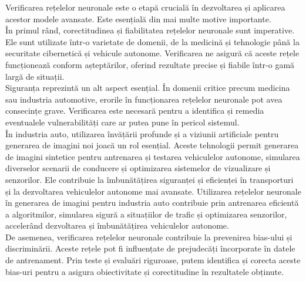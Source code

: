 \hspace{0.5 cm}
Verificarea rețelelor neuronale este o etapă crucială în dezvoltarea și aplicarea acestor modele avansate. Este esențială din mai multe motive importante. \\

În primul rând, corectitudinea și fiabilitatea rețelelor neuronale sunt imperative. Ele sunt utilizate într-o varietate de domenii, de la medicină și tehnologie până la securitate cibernetică și vehicule autonome. Verificarea ne asigură că aceste rețele funcționează conform așteptărilor, oferind rezultate precise și fiabile într-o gamă largă de situații. \\

Siguranța reprezintă un alt aspect esențial. În domenii critice precum medicina sau industria automotive, erorile în funcționarea rețelelor neuronale pot avea consecințe grave. Verificarea este necesară pentru a identifica și remedia eventualele vulnerabilități care ar putea pune în pericol sistemul. \\

În industria auto, utilizarea învățării profunde și a viziunii artificiale pentru generarea de imagini noi joacă un rol esențial. Aceste tehnologii permit generarea de imagini sintetice pentru antrenarea și testarea vehiculelor autonome, simularea diverselor scenarii de conducere și optimizarea sistemelor de vizualizare și senzorilor. Ele contribuie la îmbunătățirea siguranței și eficienței în transporturi și la dezvoltarea vehiculelor autonome mai avansate. Utilizarea rețelelor neuronale în generarea de imagini pentru industria auto contribuie prin antrenarea eficientă a algoritmilor, simularea sigură a situațiilor de trafic și optimizarea senzorilor, accelerând dezvoltarea și îmbunătățirea vehiculelor autonome. \\

De asemenea, verificarea rețelelor neuronale contribuie la prevenirea bias-ului și discriminării. Aceste rețele pot fi influențate de prejudecăți încorporate în datele de antrenament. Prin teste și evaluări riguroase, putem identifica și corecta aceste bias-uri pentru a asigura obiectivitate și corectitudine în rezultatele obținute.